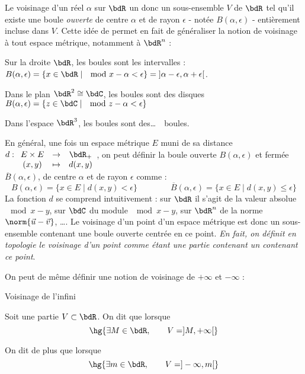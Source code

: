 \documentclass[a4paper,french,bookmarks]{article}
\begin{document}
\begin{hpnote}
       Le voisinage d'un réel $\alpha$ sur $\bdR$ un donc un sous-ensemble $V$ de $\bdR$ tel qu'il existe une boule \textit{ouverte} de centre $\alpha$ et de rayon $\epsilon$ - notée $B(\alpha, \epsilon)$ - entièrement incluse dans $V$. Cette idée de  permet en fait de généraliser la notion de voisinage à tout espace métrique, notamment à $\bdR^n$ :

        \begin{enumerate}
           \itt Sur la droite $\bdR$, les boules sont les intervalles : $B(\alpha, \epsilon) = \{ x \in \bdR \mid \mod{x - \alpha} < \epsilon\} = \left]\alpha - \epsilon, \alpha + \epsilon\right[$.
    
          \itt Dans le plan $\bdR^2 \cong \bdC$, les boules sont des disques $B(\alpha, \epsilon) = \{ z \in \bdC \mid \mod{z - \alpha} < \epsilon\}$
    
          \itt Dans l'espace $\bdR^3$, les boules sont des\dots \ \ boules.
        \end{enumerate}

        En général, une fois un espace métrique $E$ muni de sa distance $d :     \begin{array}[t]{ccc}
           E\times E &\to &\bdR_+  \\
          (x,y) &\mapsto &d(x, y)
        \end{array}$, on peut définir la boule ouverte $B(\alpha, \epsilon)$ et fermée $\overline{B}(\alpha, \epsilon)$, de centre $\alpha$ et de rayon $\epsilon$ comme :
        \[ B(\alpha, \epsilon) = \{ x \in E \mid d(x, y) < \epsilon\} \qquad\qquad \overline{B}(\alpha, \epsilon) = \{ x \in E \mid d(x, y) \leq \epsilon\}\]
        La fonction $d$ se comprend intuitivement : sur $\bdR$ il s'agit de la valeur absolue $\mod{x-y}$, sur $\bdC$ du module $\mod{x -y}$, sur $\bdR^n$ de la norme $\norm{\vec u - \vec v}$, \dots. Le voisinage d'un point d'un espace métrique est donc un sous-ensemble contenant une boule ouverte centrée en ce point. \textit{En fait, on définit en topologie le voisinage d'un point comme étant une partie contenant un  contenant ce point}.
\end{hpnote}

On peut de même définir une notion de voisinage de $+\infty$ et $-\infty$ :

\begin{definition}{Voisinage de l'infini}{}
    \begin{enumerate}
        \ithand Soit une partie $V \subset \bdR$. On dit que  lorsque
        \[\hg{\exists M \in \bdR, \qquad V = ]M, +\infty[} \]
        
        \ithand On dit de plus que  lorsque
        \[ \hg{\exists m \in \bdR, \qquad V = ]-\infty, m[} \]
    \end{enumerate}
\end{definition}
\end{document}
